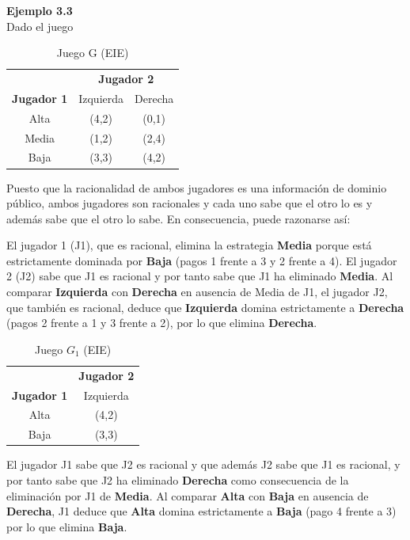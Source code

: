 \documentclass[12pt,a4paper,]{book}
\numberwithin{dummy}{section}
\theoremstyle{ocrenumbox}
\theoremstyle{blacknumex}
\theoremstyle{blacknumbox}
\theoremstyle{ocrenum}
\theoremstyle{ocrenum}
\begin{document}
\begin{tcolorbox}[colback=blue!10]
\textbf{Ejemplo 3.3} \\

Dado el juego

\begin{table}[H]
\centering
\begin{tabular}{c|cc}
 & \multicolumn{2}{c}{\textbf{Jugador 2}} \\ 
\textbf{Jugador 1} & Izquierda & Derecha\\ \hline
Alta & (4,2) & (0,1) \\
Media & (1,2) & (2,4) \\
Baja & (3,3) & (4,2)
\end{tabular}
\caption{Juego G (EIE)}
\label{tab:EIE}
\end{table}

Puesto que la racionalidad de ambos jugadores es una información de dominio público, ambos jugadores son racionales y cada uno sabe que el otro lo es y además sabe que el otro lo sabe. En consecuencia, puede razonarse así:

El jugador 1 (J1), que es racional, elimina la estrategia \textbf{Media} porque está estrictamente dominada por \textbf{Baja} (pagos 1 frente a 3 y 2 frente a 4). El jugador 2 (J2) sabe que J1 es racional y por tanto sabe que J1 ha eliminado \textbf{Media}. Al comparar \textbf{Izquierda} con \textbf{Derecha} en ausencia de Media de J1, el jugador J2, que también es racional, deduce que \textbf{Izquierda} domina estrictamente a \textbf{Derecha} (pagos 2 frente a 1 y 3 frente a 2), por lo que elimina \textbf{Derecha}.

\begin{table}[H]
\centering
\begin{tabular}{c|c}
 & \multicolumn{1}{c}{\textbf{Jugador 2}} \\ 
\textbf{Jugador 1} & Izquierda\\ \hline
Alta & (4,2)\\
Baja & (3,3)
\end{tabular}
\caption{Juego $G_1$ (EIE)}
\label{tab:EIE}
\end{table}

El jugador J1 sabe que J2 es racional y que además J2 sabe que J1 es racional, y por tanto sabe que J2 ha eliminado \textbf{Derecha} como consecuencia de la eliminación por J1 de \textbf{Media}. Al comparar \textbf{Alta} con \textbf{Baja} en ausencia de \textbf{Derecha}, J1 deduce que \textbf{Alta} domina estrictamente a \textbf{Baja} (pago 4 frente a 3) por lo que elimina \textbf{Baja}.


\end{tcolorbox}
\end{document}
